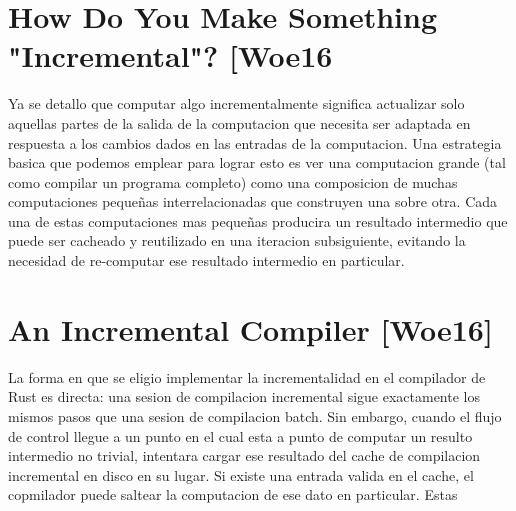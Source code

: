 \documentclass[12pt, a4paper]{report}
\begin{document}
\section*{How Do You Make Something "Incremental"? [Woe16}

Ya se detallo que computar algo incrementalmente significa actualizar solo aquellas partes de la salida de la computacion que necesita ser adaptada en respuesta a los cambios dados en las entradas de la computacion.
Una estrategia basica que podemos emplear para lograr esto es ver una computacion grande (tal como compilar un programa completo) como una composicion de muchas computaciones pequeñas interrelacionadas que construyen una sobre otra.
Cada una de estas computaciones mas pequeñas producira un resultado intermedio que puede ser cacheado y reutilizado en una iteracion subsiguiente, evitando la necesidad de re-computar ese resultado intermedio en particular.
\cite{rust_blog_incremental_compilation}

\section*{An Incremental Compiler [Woe16]}

La forma en que se eligio implementar la incrementalidad en el compilador de Rust es directa: una sesion de compilacion incremental sigue exactamente los mismos pasos que una sesion de compilacion batch.
Sin embargo, cuando el flujo de control llegue a un punto en el cual esta a punto de computar un resulto intermedio no trivial, intentara cargar ese resultado del cache de compilacion incremental en disco en su lugar.
Si existe una entrada valida en el cache, el copmilador puede saltear la computacion de ese dato en particular.
Estas
\end{document}
